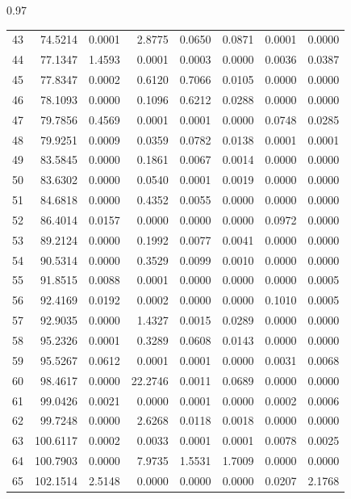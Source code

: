 \documentclass[../Thesis-IJspeert.tex]{subfiles}
\begin{document}
\begin{spacing}{0.97}
\begin{small}
\begin{longtable}{crrrrrrr}
			43 & 74.5214 & 0.0001 & 2.8775 & 0.0650 & 0.0871 & 0.0001 & 0.0000 \\  
			44 & 77.1347 & 1.4593 & 0.0001 & 0.0003 & 0.0000 & 0.0036 & 0.0387 \\  
			45 & 77.8347 & 0.0002 & 0.6120 & 0.7066 & 0.0105 & 0.0000 & 0.0000 \\  
			46 & 78.1093 & 0.0000 & 0.1096 & 0.6212 & 0.0288 & 0.0000 & 0.0000 \\  
			47 & 79.7856 & 0.4569 & 0.0001 & 0.0001 & 0.0000 & 0.0748 & 0.0285 \\  
			48 & 79.9251 & 0.0009 & 0.0359 & 0.0782 & 0.0138 & 0.0001 & 0.0001 \\  
			49 & 83.5845 & 0.0000 & 0.1861 & 0.0067 & 0.0014 & 0.0000 & 0.0000 \\  
			50 & 83.6302 & 0.0000 & 0.0540 & 0.0001 & 0.0019 & 0.0000 & 0.0000 \\  
			51 & 84.6818 & 0.0000 & 0.4352 & 0.0055 & 0.0000 & 0.0000 & 0.0000 \\  
			52 & 86.4014 & 0.0157 & 0.0000 & 0.0000 & 0.0000 & 0.0972 & 0.0000 \\  
			53 & 89.2124 & 0.0000 & 0.1992 & 0.0077 & 0.0041 & 0.0000 & 0.0000 \\  
			54 & 90.5314 & 0.0000 & 0.3529 & 0.0099 & 0.0010 & 0.0000 & 0.0000 \\  
			55 & 91.8515 & 0.0088 & 0.0001 & 0.0000 & 0.0000 & 0.0000 & 0.0005 \\  
			56 & 92.4169 & 0.0192 & 0.0002 & 0.0000 & 0.0000 & 0.1010 & 0.0005 \\  
			57 & 92.9035 & 0.0000 & 1.4327 & 0.0015 & 0.0289 & 0.0000 & 0.0000 \\  
			58 & 95.2326 & 0.0001 & 0.3289 & 0.0608 & 0.0143 & 0.0000 & 0.0000 \\  
			59 & 95.5267 & 0.0612 & 0.0001 & 0.0001 & 0.0000 & 0.0031 & 0.0068 \\  
			60 & 98.4617 & 0.0000 & 22.2746 & 0.0011 & 0.0689 & 0.0000 & 0.0000 \\  
			61 & 99.0426 & 0.0021 & 0.0000 & 0.0001 & 0.0000 & 0.0002 & 0.0006 \\  
			62 & 99.7248 & 0.0000 & 2.6268 & 0.0118 & 0.0018 & 0.0000 & 0.0000 \\  
			63 & 100.6117 & 0.0002 & 0.0033 & 0.0001 & 0.0001 & 0.0078 & 0.0025 \\  
			64 & 100.7903 & 0.0000 & 7.9735 & 1.5531 & 1.7009 & 0.0000 & 0.0000 \\  
			65 & 102.1514 & 2.5148 & 0.0000 & 0.0000 & 0.0000 & 0.0207 & 2.1768 \\  

\end{longtable}
\end{small}
\end{spacing}
\end{document}
